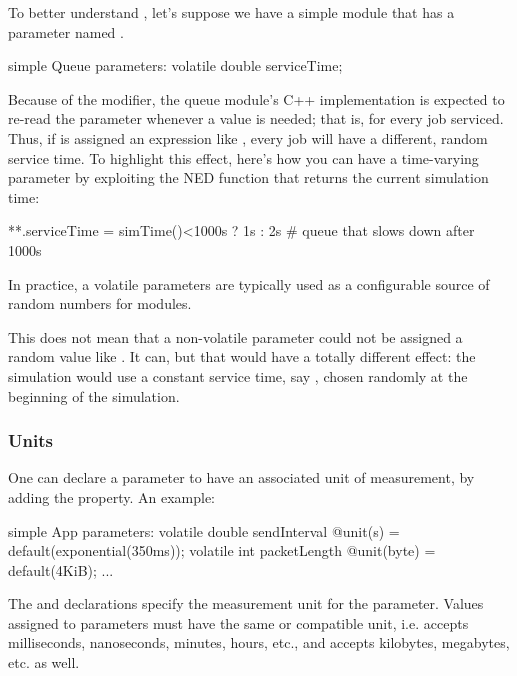 To better understand , let's suppose we have a
 simple module that has a  parameter
named .

\begin{ned}
simple Queue
{
    parameters:
        volatile double serviceTime;
}
\end{ned}

Because of the  modifier, the queue module's C++
implementation is expected to re-read the  parameter
whenever a value is needed; that is, for every job serviced. Thus, if
 is assigned an expression like ,
every job will have a different, random service time. To highlight this
effect, here's how you can have a time-varying parameter by exploiting
the  NED function that returns the current simulation time:

\begin{inifile}
**.serviceTime = simTime()<1000s ? 1s : 2s  # queue that slows down after 1000s
\end{inifile}

In practice, a volatile parameters are typically used as a configurable
source of random numbers for modules.

\begin{note}
    This does not mean that a non-volatile parameter could not be assigned a
    random value like . It can, but that would
    have a totally different effect: the simulation would use a constant
    service time, say , chosen randomly at the beginning
    of the simulation.
\end{note}

\subsubsection{Units}

One can declare a parameter to have an associated unit of measurement,
by adding the  property. An example:

\begin{ned}
simple App
{
    parameters:
        volatile double sendInterval @unit(s) = default(exponential(350ms));
        volatile int packetLength @unit(byte) = default(4KiB);
    ...
}
\end{ned}

The  and  declarations specify the measurement unit
for the parameter. Values assigned to parameters must have the same or
compatible unit, i.e.  accepts milliseconds, nanoseconds,
minutes, hours, etc., and  accepts kilobytes, megabytes,
etc. as well.

